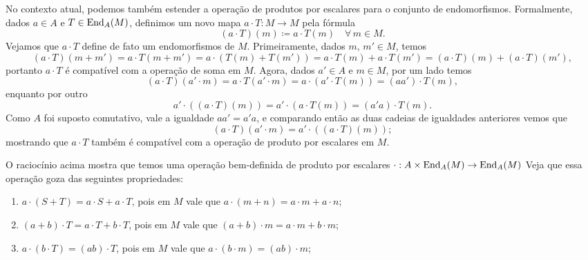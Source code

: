 \begin{exem}
  No contexto atual, podemos também estender a operação de produtos por escalares para o conjunto de endomorfismos.
  Formalmente, dados $a \in A$ e $T \in \mathrm{End}_A(M)$, definimos um novo mapa $a \cdot T: M \to M$ pela fórmula
  \begin{displaymath}
    (a \cdot T)(m) \coloneqq a \cdot T(m) \quad \forall\, m \in M.
  \end{displaymath}
  Vejamos que $a \cdot T$ define de fato um endomorfismos de $M$.
  Primeiramente, dados $m,\,m' \in M$, temos
  \begin{displaymath}
    (a \cdot T)(m + m') = a \cdot T(m + m') = a \cdot(T(m) + T(m')) = a \cdot T(m) + a \cdot T(m') = (a \cdot T)(m) + (a \cdot T)(m'),
  \end{displaymath}
  portanto $a \cdot T$ é compatível com a operação de soma em $M$.
  Agora, dados $a' \in A$ e $m \in M$, por um lado temos
  \begin{displaymath}
    (a \cdot T)(a' \cdot m) = a \cdot T(a' \cdot m) = a \cdot (a' \cdot T(m)) = (aa') \cdot T(m),
  \end{displaymath}
  enquanto por outro
  \begin{displaymath}
    a' \cdot ((a \cdot T)(m)) = a' \cdot (a \cdot T(m)) = (a'a) \cdot T(m).
  \end{displaymath}
  Como $A$ foi suposto comutativo, vale a igualdade $aa' = a'a$, e comparando então as duas cadeias de igualdades anteriores vemos que
  \begin{displaymath}
    (a \cdot T)(a' \cdot m) = a' \cdot ((a \cdot T)(m));
  \end{displaymath}
  mostrando que $a \cdot T$ também é compatível com a operação de produto por escalares em $M$.

  O raciocínio acima mostra que temos uma operação bem-definida de produto por escalares $\cdot: A \times \mathrm{End}_{A}(M) \to \mathrm{End}_{A}(M)$
  Veja que essa operação goza das seguintes propriedades:
  \begin{enumerate}
  \item $a \cdot (S+T) = a \cdot S + a \cdot T$, pois em $M$ vale que $a \cdot (m+n) = a \cdot m + a \cdot n$;
    
  \item $(a+b) \cdot T = a \cdot T + b \cdot T$, pois em $M$ vale que $(a+b) \cdot m = a \cdot m + b \cdot m$;
    
  \item $a \cdot (b \cdot T) = (ab) \cdot T$, pois em $M$ vale que $a \cdot (b \cdot m) = (ab) \cdot m$;
    

\end{enumerate}
\end{exem}
